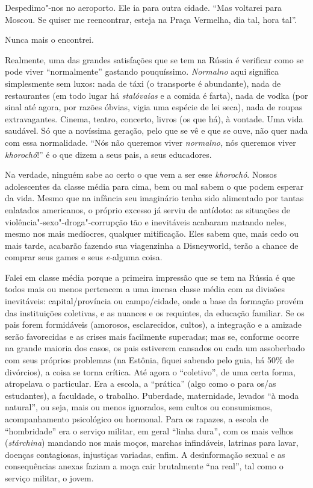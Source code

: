 Despedimo"-nos no aeroporto. Ele ia para outra cidade. ``Mas voltarei
para Moscou. Se quiser me reencontrar, esteja na Praça Vermelha, dia
tal, hora tal''.

Nunca mais o encontrei.

Realmente, uma das grandes satisfações que se tem na Rússia é verificar
como se pode viver ``normalmente'' gastando pouquíssimo. \emph{Normalno}
aqui significa simplesmente sem luxos: nada de táxi (o transporte é
abundante), nada de restaurantes (em todo lugar há \emph{stalóvaias} e a
comida é farta), nada de vodka (por sinal até agora, por razões óbvias,
vigia uma espécie de lei seca), nada de roupas extravagantes. Cinema,
teatro, concerto, livros (os que há), à vontade. Uma vida saudável. Só
que a novíssima geração, pelo que se vê e que se ouve, não quer nada com
essa normalidade. ``Nós não queremos viver \emph{normalno,} nós queremos
viver \emph{khorochó}!'' é o que dizem a seus pais, a seus educadores.

Na verdade, ninguém sabe ao certo o que vem a ser esse \emph{khorochó}.
Nossos adolescentes da classe média para cima, bem ou mal sabem o que
podem esperar da vida. Mesmo que na infância seu imaginário tenha sido
alimentado por tantas enlatados americanos, o próprio excesso já serviu
de antídoto: as situações de violência"-sexo"-droga"-corrupção tão e
inevitáveis acabaram matando neles, mesmo nos mais medíocres, qualquer
mitificação. Eles sabem que, mais cedo ou mais tarde, acabarão fazendo
sua viagenzinha a Disneyworld, terão a chance de comprar seus games e
seus \emph{e-}alguma coisa.

Falei em classe média porque a primeira impressão que se tem na Rússia é
que todos mais ou menos pertencem a uma imensa classe média com as
divisões inevitáveis: capital/província ou campo/cidade, onde a base da
formação provém das instituições coletivas, e as nuances e os requintes,
da educação familiar. Se os pais forem formidáveis (amorosos,
esclarecidos, cultos), a integração e a amizade serão favorecidas e as
crises mais facilmente superadas; mas se, conforme ocorre na grande
maioria dos casos, os pais estiverem cansados ou cada um assoberbado com
seus próprios problemas (na Estônia, fiquei sabendo pelo guia, há 50\%
de divórcios), a coisa se torna crítica. Até agora o ``coletivo'', de
uma certa forma, atropelava o particular. Era a escola, a ``prática''
(algo como o  para os/as estudantes), a faculdade, o trabalho.
Puberdade, maternidade, levados ``à moda natural'', ou seja, mais ou
menos ignorados, sem cultos ou consumismos, acompanhamento psicológico
ou hormonal. Para os rapazes, a escola de ``hombridade'' era o serviço
militar, em geral ``linha dura'', com os mais velhos (\emph{stárchina})
mandando nos mais moços, marchas infindáveis, latrinas para lavar,
doenças contagiosas, injustiças variadas, enfim. A desinformação sexual
e as consequências anexas faziam a moça cair brutalmente ``na real'',
tal como o serviço militar, o jovem.

